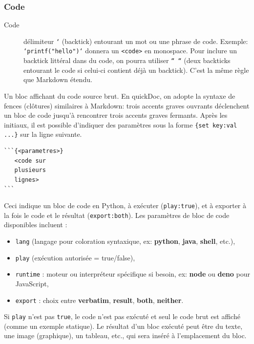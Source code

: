 \documentclass[a4paper,12pt]{article}
\begin{document}
\subsubsection{Code}
\label{sec:org3937a75}
\begin{description}
\item[{Code}] délimiteur \texttt{`} (backtick) entourant un mot ou une phrase de code. Exemple: \texttt{`printf("hello")`} donnera un \texttt{<code>} en monospace. Pour inclure un backtick littéral dans du code, on pourra utiliser \texttt{`` ``} (deux backticks entourant le code si celui-ci contient déjà un backtick). C’est la même règle que Markdown étendu.
\end{description}

Un bloc affichant du code source brut. En quickDoc, on adopte la syntaxe de fences (clôtures) similaires à Markdown: trois accents graves ouvrants déclenchent un bloc de code jusqu’à rencontrer trois accents graves fermants. Après les initiaux, il est possible d’indiquer des paramètres sous la forme \texttt{\{set key:val ...\}} sur la ligne suivante.

\begin{verbatim}
```{<parametres>}
   <code sur
   plusieurs
   lignes>
```
\end{verbatim}

Ceci indique un bloc de code en Python, à exécuter (\texttt{play:true}), et à exporter à la fois le code et le résultat (\texttt{export:both}). Les paramètres de bloc de code disponibles incluent : 
\begin{itemize}
\item \texttt{lang} (langage pour coloration syntaxique, ex: \textbf{python}, \textbf{java}, \textbf{shell}, etc.),
\item \texttt{play} (exécution autorisée = true/false),
\item \texttt{runtime} : moteur ou interpréteur spécifique si besoin, ex: \textbf{node} ou \textbf{deno} pour JavaScript,
\item \texttt{export} : choix entre \textbf{verbatim}, \textbf{result}, \textbf{both}, \textbf{neither}.
\end{itemize}
Si \texttt{play} n’est pas \texttt{true}, le code n’est pas exécuté et seul le code brut est affiché (comme un exemple statique). Le résultat d’un bloc exécuté peut être du texte, une image (graphique), un tableau, etc., qui sera inséré à l’emplacement du bloc.
\end{document}
